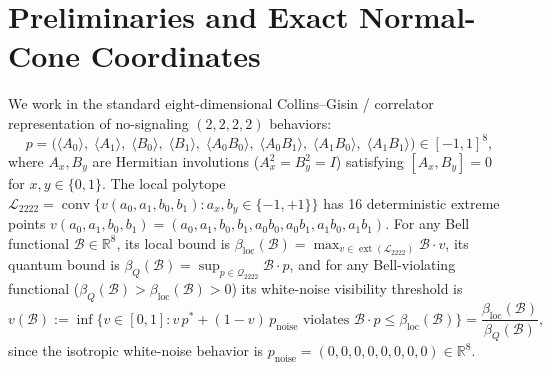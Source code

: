 \documentclass[11pt,a4paper]{article}
\newcommand{\RR}{\mathbb{R}}
\newcommand{\calQ}{\mathcal{Q}_{2222}}
\newcommand{\calL}{\mathcal{L}_{2222}}
\newcommand{\calB}{\mathcal{B}}
\newcommand{\ext}{\operatorname{ext}}
\newcommand{\conv}{\operatorname{conv}}
\begin{document}
\section{Preliminaries and Exact Normal-Cone Coordinates}
\label{sec:prelim}

We work in the standard eight-dimensional Collins--Gisin / correlator representation of no-signaling $(2,2,2,2)$ behaviors:
\begin{equation}
  p = \bigl(\langle A_0\rangle,\; \langle A_1\rangle,\; \langle B_0\rangle,\; \langle B_1\rangle,\; \langle A_0 B_0\rangle,\; \langle A_0 B_1\rangle,\; \langle A_1 B_0\rangle,\; \langle A_1 B_1\rangle\bigr) \in [-1,1]^8,
\end{equation}
where $A_x, B_y$ are Hermitian involutions ($A_x^2 = B_y^2 = I$) satisfying $[A_x, B_y] = 0$ for $x,y \in \{0,1\}$.
The local polytope $\calL = \conv\{v(a_0,a_1,b_0,b_1) : a_x, b_y \in \{-1,+1\}\}$ has 16 deterministic extreme points $v(a_0,a_1,b_0,b_1) = (a_0, a_1, b_0, b_1, a_0 b_0, a_0 b_1, a_1 b_0, a_1 b_1)$.
For any Bell functional $\calB \in \RR^8$, its local bound is $\beta_{\mathrm{loc}}(\calB) = \max_{v \in \ext(\calL)} \calB \cdot v$, its quantum bound is $\beta_Q(\calB) = \sup_{p \in \calQ} \calB \cdot p$, and for any Bell-violating functional ($\beta_Q(\calB) > \beta_{\mathrm{loc}}(\calB) > 0$) its white-noise visibility threshold is
\begin{equation}
  v(\calB) := \inf\bigl\{v \in [0,1] : v\, p^* + (1-v)\, p_{\mathrm{noise}} \text{ violates } \calB \cdot p \le \beta_{\mathrm{loc}}(\calB)\bigr\} = \frac{\beta_{\mathrm{loc}}(\calB)}{\beta_Q(\calB)},
\end{equation}
since the isotropic white-noise behavior is $p_{\mathrm{noise}} = (0,0,0,0,0,0,0,0) \in \RR^8$.
\end{document}
